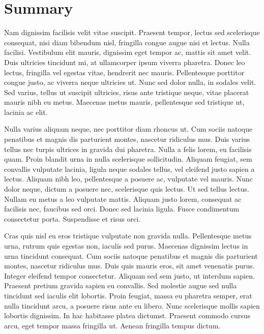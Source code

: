 \chapter{Summary}
\label{section:summary}

Nam dignissim facilisis velit vitae suscipit. Praesent tempor, lectus sed scelerisque consequat, nisi diam bibendum nisl, fringilla congue augue nisi et lectus. Nulla facilisi. Vestibulum elit mauris, dignissim eget tempor ac, mattis sit amet velit. Duis ultricies tincidunt mi, at ullamcorper ipsum viverra pharetra. Donec leo lectus, fringilla vel egestas vitae, hendrerit nec mauris. Pellentesque porttitor congue justo, ac viverra neque ultricies ut. Nunc sed dolor nulla, in sodales velit. Sed varius, tellus ut suscipit ultricies, risus ante tristique neque, vitae placerat mauris nibh eu metus. Maecenas metus mauris, pellentesque sed tristique ut, lacinia ac elit.

Nulla varius aliquam neque, nec porttitor diam rhoncus ut. Cum sociis natoque penatibus et magnis dis parturient montes, nascetur ridiculus mus. Duis varius tellus nec turpis ultrices in gravida dui pharetra. Nulla a felis lorem, eu facilisis quam. Proin blandit urna in nulla scelerisque sollicitudin. Aliquam feugiat, sem convallis vulputate lacinia, ligula neque sodales tellus, vel eleifend justo sapien a lectus. Aliquam nibh leo, pellentesque a posuere ac, vulputate vel mauris. Nunc dolor neque, dictum a posuere nec, scelerisque quis lectus. Ut sed tellus lectus. Nullam eu metus a leo vulputate mattis. Aliquam justo lorem, consequat ac facilisis nec, faucibus sed orci. Donec sed lacinia ligula. Fusce condimentum consectetur porta. Suspendisse et risus orci.

Cras quis nisl eu eros tristique vulputate non gravida nulla. Pellentesque metus urna, rutrum quis egestas non, iaculis sed purus. Maecenas dignissim lectus in urna tincidunt consequat. Cum sociis natoque penatibus et magnis dis parturient montes, nascetur ridiculus mus. Duis quis mauris eros, sit amet venenatis purus. Integer eleifend tempor consectetur. Aliquam sed sem justo, ut interdum sapien. Praesent pretium gravida sapien eu convallis. Sed molestie augue sed nulla tincidunt sed iaculis elit lobortis. Proin feugiat, massa eu pharetra semper, erat nulla tincidunt arcu, a posuere risus ante eu libero. Nunc scelerisque mollis sapien lobortis dignissim. In hac habitasse platea dictumst. Praesent commodo cursus arcu, eget tempor massa fringilla ut. Aenean fringilla tempus dictum.

